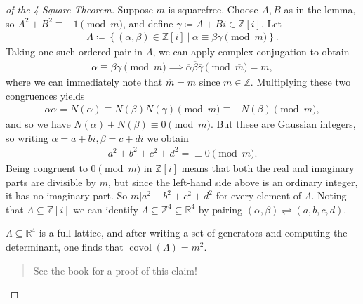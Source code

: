 \begin{proof}[of the 4 Square Theorem]

Suppose \(m\) is squarefree. Choose \(A, B\) as in the lemma, so
\(A^2 + B^2 \equiv -1 \pmod m\), and define
\(\gamma \coloneqq A+ Bi \in {\mathbb{Z}}[i]\). Let
\begin{align*} \Lambda \coloneqq\left\{{ (\alpha, \beta) \in {\mathbb{Z}}[i] {~\mathrel{\Big|}~}\alpha\equiv \beta \gamma \pmod m }\right\} .\end{align*}
Taking one such ordered pair in \(\Lambda\), we can apply complex
conjugation to obtain
\begin{align*}
\alpha\equiv \beta \gamma\pmod m \implies {\overline{{ \alpha}}} {\overline{{ \beta}}} {\overline{{ \gamma}}} \pmod{\overline{{m}}} = m
,\end{align*}
where we can immediately note that \({\overline{{m}}} = m\) since
\(m\in {\mathbb{Z}}\). Multiplying these two congruences yields
\begin{align*}
\alpha{\overline{{\alpha}}} 
= N( \alpha) 
\equiv N( \beta) N( \gamma) \pmod m
\equiv - N( \beta) \pmod m
,\end{align*}
and so we have \(N( \alpha) + N( \beta) \equiv 0 \pmod m\). But these
are Gaussian integers, so writing \(\alpha = a + bi, \beta = c + di\) we
obtain
\begin{align*}
a^2 + b^2 + c^2 + d^2 = \equiv 0 \pmod m
.\end{align*}
Being congruent to \(0\pmod m\) in \({\mathbb{Z}}[i]\) means that both
the real and imaginary parts are divisible by \(m\), but since the
left-hand side above is an ordinary integer, it has no imaginary part.
So \(m \mathrel{\Big|}a^2 + b^2 + c^2 + d^2\) for every element of
\(\Lambda\). Noting that \(\Lambda \subseteq {\mathbb{Z}}[i]\) we can
identify \(\Lambda \subseteq {\mathbb{Z}}^4 \subseteq {\mathbb{R}}^4\)
by pairing \(( \alpha, \beta) \rightleftharpoons(a,b,c,d)\).

\begin{claim}

\(\Lambda\subseteq {\mathbb{R}}^4\) is a full lattice, and after writing
a set of generators and computing the determinant, one finds that
\(\operatorname{covol}( \Lambda) = m^2\).

\end{claim}

\begin{quote}
See the book for a proof of this claim!
\end{quote}


\end{proof}
